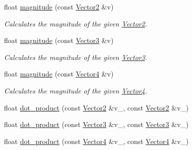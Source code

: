 \begin{DoxyCompactItemize}
\item 
\hypertarget{namespacechaos_1_1gfx_a9ba43b8cdaa6b28dfeb2c7ed6036a54b}{float \hyperlink{namespacechaos_1_1gfx_a9ba43b8cdaa6b28dfeb2c7ed6036a54b}{magnitude} (const \hyperlink{classchaos_1_1gfx_1_1_vector2}{Vector2} \&v)}\label{namespacechaos_1_1gfx_a9ba43b8cdaa6b28dfeb2c7ed6036a54b}

\begin{DoxyCompactList}\small\item\em Calculates the magnitude of the given \hyperlink{classchaos_1_1gfx_1_1_vector2}{Vector2}. \end{DoxyCompactList}\item 
\hypertarget{namespacechaos_1_1gfx_afb2d655cd9f5cd51f31f8126112689aa}{float \hyperlink{namespacechaos_1_1gfx_afb2d655cd9f5cd51f31f8126112689aa}{magnitude} (const \hyperlink{classchaos_1_1gfx_1_1_vector3}{Vector3} \&v)}\label{namespacechaos_1_1gfx_afb2d655cd9f5cd51f31f8126112689aa}

\begin{DoxyCompactList}\small\item\em Calculates the magnitude of the given \hyperlink{classchaos_1_1gfx_1_1_vector3}{Vector3}. \end{DoxyCompactList}\item 
\hypertarget{namespacechaos_1_1gfx_aecc53831b19cb7a86e0c32e6d9c148a9}{float \hyperlink{namespacechaos_1_1gfx_aecc53831b19cb7a86e0c32e6d9c148a9}{magnitude} (const \hyperlink{classchaos_1_1gfx_1_1_vector4}{Vector4} \&v)}\label{namespacechaos_1_1gfx_aecc53831b19cb7a86e0c32e6d9c148a9}

\begin{DoxyCompactList}\small\item\em Calculates the magnitude of the given \hyperlink{classchaos_1_1gfx_1_1_vector4}{Vector4}. \end{DoxyCompactList}\item 
float \hyperlink{namespacechaos_1_1gfx_acd651c7bb94c56e7070ca515a3515666}{dot\-\_\-product} (const \hyperlink{classchaos_1_1gfx_1_1_vector2}{Vector2} \&v\-\_, const \hyperlink{classchaos_1_1gfx_1_1_vector2}{Vector2} \&v\-\_)
\item 
float \hyperlink{namespacechaos_1_1gfx_a83b19bb75ac950fd15409cc8cb788d3b}{dot\-\_\-product} (const \hyperlink{classchaos_1_1gfx_1_1_vector3}{Vector3} \&v\-\_, const \hyperlink{classchaos_1_1gfx_1_1_vector3}{Vector3} \&v\-\_)
\item 
float \hyperlink{namespacechaos_1_1gfx_ae77430b2fa8891e2dfcbac28b85b1aad}{dot\-\_\-product} (const \hyperlink{classchaos_1_1gfx_1_1_vector4}{Vector4} \&v\-\_, const \hyperlink{classchaos_1_1gfx_1_1_vector4}{Vector4} \&v\-\_)
\end{DoxyCompactItemize}


